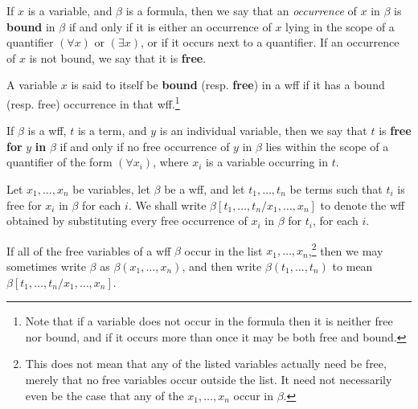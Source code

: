 \begin{defn}
\label{Defn: Bound and Free Occurrences}
If $x$ is a variable, and $\beta$ is a formula, then we say that an \emph{occurrence} of $x$ in $\beta$ is \textbf{bound} in $\beta$ if and only if it is either an occurrence of $x$ lying in the scope of a quantifier $(\forall x)$ or $(\exists x)$, or if it occurs next to a quantifier. If an occurrence of $x$ is not bound, we say that it is \textbf{free}.
\end{defn}

\begin{defn}
\label{Defn: Bound and Free Variables}
A variable $x$ is said to itself be \textbf{bound} (resp. \textbf{free}) in a wff if it has a bound (resp. free) occurrence in that wff.\footnote{Note that if a variable does not occur in the formula then it is neither free nor bound, and if it occurs more than once it may be both free and bound.}
\end{defn}

\begin{defn}
\label{Defn: Free for substitution}
If $\beta$ is a wff, $t$ is a term, and $y$ is an individual variable, then we say that $t$ is \textbf{free for} $y$ \textbf{in} $\beta$ if and only if no free occurrence of $y$ in $\beta$ lies within the scope of a quantifier of the form $(\forall x_i)$, where $x_i$ is a variable occurring in $t$. 
\end{defn}

\begin{defn}
\label{Defn: Substitution into a wff}
Let $x_1, \dots, x_n$ be variables, let $\beta$ be a wff, and let $t_1, \dots, t_n$ be terms such that $t_i$ is free for $x_i$ in $\beta$ for each $i$. We shall write $\beta[t_1, \dots, t_n / x_1, \dots, x_n]$ to denote the wff obtained by substituting every free occurrence of $x_i$ in $\beta$ for $t_i$, for each $i$. 

If all of the free variables of a wff $\beta$ occur in the list $x_1, \dots, x_n$,\footnote{This does not mean that any of the listed variables actually need be free, merely that no free variables occur outside the list. It need not necessarily even be the case that any of the $x_1, \dots, x_n$ occur in $\beta$.} then we may sometimes write $\beta$ as $\beta(x_1, \dots, x_n)$, and then write $\beta(t_1, \dots, t_n)$ to mean $\beta[t_1, \dots, t_n / x_1, \dots, x_n]$. 
\end{defn}

